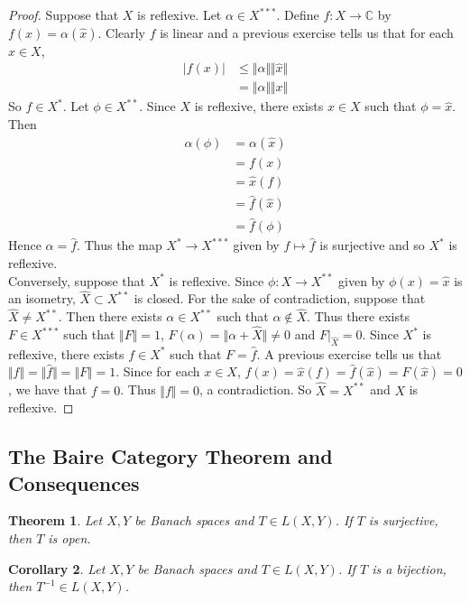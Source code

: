 \documentclass[12pt]{amsart}
\newtheorem{thm}{Theorem}[section]
\newtheorem{cor}[thm]{Corollary}
\newcommand{\al}{\alpha}
\newcommand{\C}{\mathbb{C}}
\newcommand{\n}{\Vert}
\begin{document}
\begin{proof}
Suppose that $X$ is reflexive. Let $\al \in X^{***}$. Define $f :X \rightarrow \C$ by $f(x) = \al(\hat{x})$. Clearly $f$ is linear and a previous exercise tells us that for each $x \in X$, 
\begin{align*}
\vert f(x) \vert 
& \leq \n \al \n \n \hat{x} \n\\
&= \n \al \n \n x \n
\end{align*}
So $f \in X^*$.
Let $\phi \in X^{**}$. Since $X$ is reflexive, there exists $x \in X$ such that $\phi = \hat{x}$. Then 
\begin{align*}
\al(\phi)
&= \al(\hat{x})\\
&= f(x)\\
&= \hat{x}(f)\\
&= \hat{f}(\hat{x})\\
&= \hat{f}(\phi)
\end{align*}
Hence $\al = \hat{f}$. Thus the map $X^* \rightarrow X^{***}$ given by $f \mapsto \hat{f} $ is surjective and so $X^{*}$ is reflexive.\vspace{.5cm}\\
Conversely, suppose that $X^*$ is reflexive. Since $\phi:X \rightarrow X^{**}$ given by $\phi(x) = \hat{x}$ is an isometry, $\widehat{X} \subset X^{**}$ is closed. For the sake of contradiction, suppose that $\widehat{X} \neq X^{**}$. Then there exists $\al \in X^{**}$ such that $\al \not \in \widehat{X}$. Thus there exists $F \in X^{***}$ such that $\n F \n = 1$, $F(\al) = \n \al + \widehat{X} \n \neq 0$ and $F|_{\widehat{X}}=0$. Since $X^*$ is reflexive, there exists $f \in X^*$ such that $F = \hat{f}$. A previous exercise tells us that $\n f \n = \n \hat{f} \n = \n F \n = 1$. Since for each $x \in X$, $f(x) = \hat{x}(f) = \hat{f}(\hat{x}) = F(\hat{x}) = 0$, we have that $f = 0$. Thus $\n f \n = 0$, a contradiction. So $\widehat{X} = X^{**}$ and $X$ is reflexive.

\end{proof}

\subsection{The Baire Category Theorem and Consequences}

\begin{thm}
Let $X, Y$ be Banach spaces and $T\in L(X,Y)$. If $T$ is surjective, then $T$ is open.
\end{thm}

\begin{cor}
Let $X, Y$ be Banach spaces and $T \in L(X,Y)$. If $T$ is a bijection, then $T^{-1} \in L(X,Y)$.
\end{cor}
\end{document}
